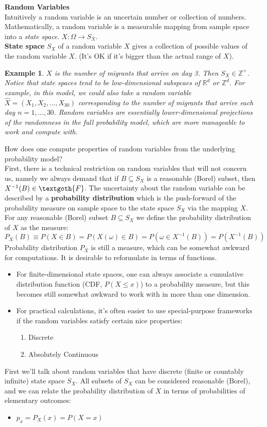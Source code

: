 \documentclass[12pt]{article}
\numberwithin{equation}{section}
\newtheorem{example}[theorem]{Example}
\begin{document}
\textbf{Random Variables}\\
Intuitively a random variable is an uncertain number or collection of numbers. Mathematically, a random variable is a measurable mapping from sample space into a \emph{state space}. $X:\Omega\to S_X$.\\
 \textbf{State space} $S_X$ of a random variable $X$ gives a collection of possible values of the random variable $X$. (It's OK if it's bigger than the actual range of $X$).
 \begin{example} $X$ is the number of migrants that arrive on day 3. Then $S_X\in\mathbb{Z}^+$. Notice that state spaces tend to be low-dimensional subspcaes of $\mathbb{R}^d$ or $\mathbb{Z}^d$. For example, in this model, we could also take a random variable $\hat{X}=(X_1,X_2,...,X_{30})$ corresponding to the number of migrants that arrive each day $n=1,...,30$. Random variables are essentially lower-dimensional projections of the randomness in the full probability model, which are more manageable to work and compute with.
 \end{example}
 How does one compute properties of random variables from the underlying probability model?\\
 First, there is a technical restriction on random variables that will not concern us, namely we always demand that if $B\subseteq S_X$ is a reasonable (Borel) subset, then $X^{-1}(B)\in\textgoth{F}$. The uncertainty about the random variable can be described by a \textbf{probability distribution} which is the push-forward of the probability measure on sample space to the state space $S_X$ via the mapping $X$. For any reasonable (Borel) subset $B\subseteq S_X$ we define the probability distribution of $X$ as the measure:
 $$P_X(B)\equiv P(X\in B)=P(X(\omega)\in B)=P(\omega\in X^{-1}(B))=P(X^{-1}(B))$$
 Probability distribution $P_X$ is still a measure, which can be somewhat awkward for computations. It is desirable to reformulate in terms of functions.
 \begin{itemize}
 \item For finite-dimensional state spaces, one can always associate a cumulative distribution function (CDF, $P(X\leq x)$) to a probability measure, but this becomes still somewhat awkward to work with in more than one dimension.
 \item For practical calculations, it's often easier to use special-purpose frameworks if the random variables satisfy certain nice properties:
    \begin{enumerate}
    \item Discrete
    \item Absolutely Continuous
    \end{enumerate}
 \end{itemize}
 First we'll talk about random variables that have discrete (finite or countably infinite) state space $S_X$. All subsets of $S_X$ can be considered reasonable (Borel), and we can relate the probability distribution of $X$ in terms of probabilities of elementary outcomes:
 \begin{itemize}
 \item $p_x=P_X(x)=P(X=x)$
 \end{itemize}
\end{document}
